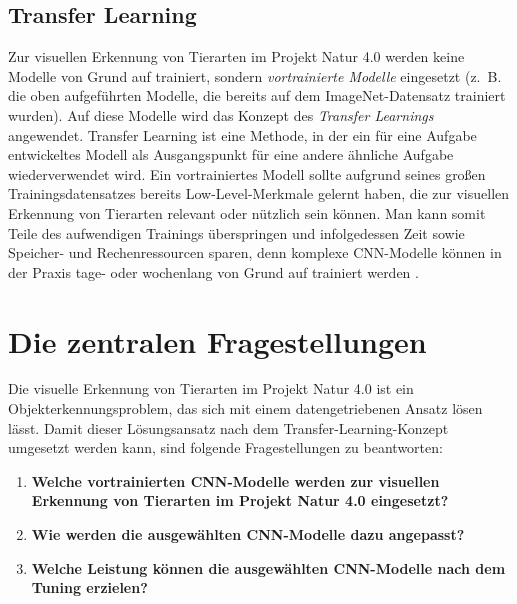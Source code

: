 \subsection{Transfer Learning}

Zur visuellen Erkennung von Tierarten im Projekt Natur 4.0 werden keine Modelle von Grund auf trainiert, sondern \emph{vortrainierte Modelle} eingesetzt (z.~B. die oben aufgeführten Modelle, die bereits auf dem ImageNet-Datensatz trainiert wurden). Auf diese Modelle wird das Konzept des \emph{Transfer Learnings} angewendet. Transfer Learning ist eine Methode, in der ein für eine Aufgabe entwickeltes Modell als Ausgangspunkt für eine andere ähnliche Aufgabe wiederverwendet wird. Ein vortrainiertes Modell sollte aufgrund seines großen Trainingsdatensatzes bereits Low-Level-Merkmale gelernt haben, die zur visuellen Erkennung von Tierarten relevant oder nützlich sein können. Man kann somit Teile des aufwendigen Trainings überspringen und infolgedessen Zeit sowie Speicher- und Rechenressourcen sparen, denn komplexe CNN-Modelle können in der Praxis tage- oder wochenlang von Grund auf trainiert werden \cite[4]{Schroff_2015}\cite[1]{codreanu2017scale}\cite{BBVADeepLearning,StanfordDAWNBench}.



\section{Die zentralen Fragestellungen}

Die visuelle Erkennung von Tierarten im Projekt Natur 4.0 ist ein Objekterkennungsproblem, das sich mit einem datengetriebenen Ansatz lösen lässt. Damit dieser Lösungsansatz nach dem Transfer-Learning-Konzept umgesetzt werden kann, sind folgende Fragestellungen zu beantworten:

\begin{enumerate}
	\item \textbf{Welche vortrainierten CNN-Modelle werden zur visuellen Erkennung von Tierarten im Projekt Natur 4.0 eingesetzt?}
	
	\item \textbf{Wie werden die ausgewählten CNN-Modelle dazu angepasst?}
	
	\item \textbf{Welche Leistung können die ausgewählten CNN-Modelle nach dem Tuning erzielen?}
\end{enumerate}

